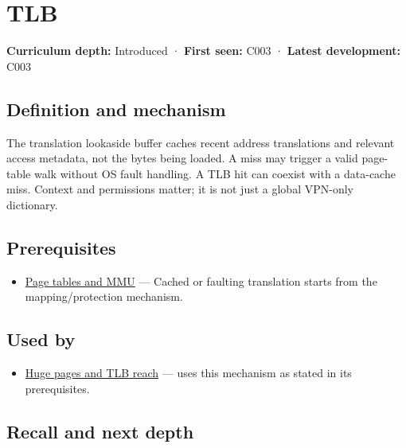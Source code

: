 \hypertarget{appendix-7a2d9c5ce511}{}\label{referencestart:appendix-7a2d9c5ce511}
\section{TLB}\label{appendix-7a2d9c5ce511-tlb}

\textbf{Curriculum depth:} Introduced · \textbf{First seen:} C003 · \textbf{Latest development:} C003

\begin{allmightroledefinition}

\subsection{Definition and mechanism}\label{appendix-7a2d9c5ce511-definition-and-mechanism}

The translation lookaside buffer caches recent address translations and relevant access metadata, not the bytes being loaded. A miss may trigger a valid page-table walk without OS fault handling. A TLB hit can coexist with a data-cache miss. Context and permissions matter; it is not just a global VPN-only dictionary.

\end{allmightroledefinition}

\subsection{Prerequisites}\label{appendix-7a2d9c5ce511-prerequisites}

\begin{itemize}
\tightlist
\item
  \hyperref[appendix-01e5905165c4]{Page tables and MMU} --- Cached or faulting translation starts from the mapping/protection mechanism.
\end{itemize}

\subsection{Used by}\label{appendix-7a2d9c5ce511-used-by}

\begin{itemize}
\tightlist
\item
  \hyperref[appendix-ce688d1acdab]{Huge pages and TLB reach} --- uses this mechanism as stated in its prerequisites.
\end{itemize}

\subsection{Recall and next depth}\label{appendix-7a2d9c5ce511-recall-and-next-depth}

